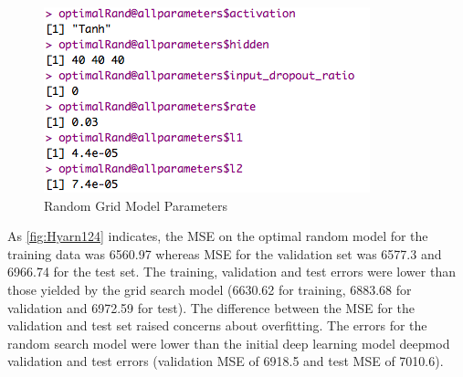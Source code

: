 \documentclass[12pt,twoside]{amherstthesis}
\begin{document}
  \begin{Shaded}
  \end{Shaded}
  
  \begin{figure}[htbp]
  \centering
  \includegraphics[scale = 0.7,angle = 0]{figure/optimRandomParam.png}
  \caption[Random Grid Model Parameters]{\normalsize{Random Grid Model Parameters}}
  \label{fig:Hyarn111}
  \end{figure}
  
  As \autoref{fig:Hyarn124} indicates, the MSE on the optimal random model
  for the training data was 6560.97 whereas MSE for the validation set was
  6577.3 and 6966.74 for the test set. The training, validation and test
  errors were lower than those yielded by the grid search model (6630.62
  for training, 6883.68 for validation and 6972.59 for test). The
  difference between the MSE for the validation and test set raised
  concerns about overfitting. The errors for the random search model were
  lower than the initial deep learning model deepmod validation and test
  errors (validation MSE of 6918.5 and test MSE of 7010.6).
  
\end{document}
